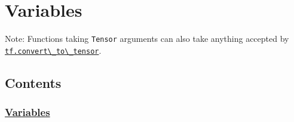 

\section{Variables }\label{variables}

Note: Functions taking \lstinline{Tensor} arguments can also take anything
accepted by
\href{../../api_docs/python/framework.md\#convert_to_tensor}{\lstinline{tf.convert\_to\_tensor}}.

\subsection{Contents}\label{contents}

\subsubsection{\texorpdfstring{\protect\hyperlink{AUTOGENERATED-variables}{Variables}}{Variables}}\label{variables-1}


